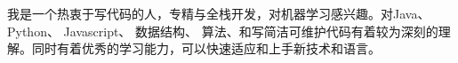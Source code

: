 

\begin{cvparagraph}

我是一个热衷于写代码的人，专精与全栈开发，对机器学习感兴趣。对Java、Python、 Javascript、 数据结构、 算法、和写简洁可维护代码有着较为深刻的理解。同时有着优秀的学习能力，可以快速适应和上手新技术和语言。
\end{cvparagraph}
